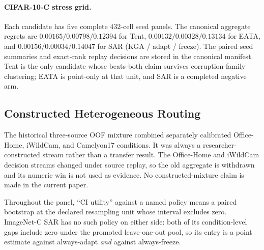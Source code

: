 \paragraph{CIFAR-10-C stress grid.} Each candidate has five complete $432$-cell seed panels. The
canonical aggregate regrets are $0.00165/0.00798/0.12394$ for Tent,
$0.00132/0.00328/0.13134$ for EATA, and $0.00156/0.00034/0.14047$ for SAR (KGA / adapt / freeze).
The paired seed summaries and exact-rank replay decisions are stored in the canonical manifest.
Tent is the only candidate whose beats-both claim survives corruption-family clustering; EATA is
point-only at that unit, and SAR is a completed negative arm.

\subsection{Constructed Heterogeneous Routing}\label{sec:constructed-routing}
The historical three-source OOF mixture combined separately calibrated Office-Home, iWildCam, and
Camelyon17 conditions. It was always a researcher-constructed stream rather than a transfer result.
The Office-Home and iWildCam decision streams changed under source replay, so the old aggregate is
withdrawn and its numeric win is not used as evidence. No constructed-mixture claim is
made in the current paper.

\noindent Throughout the panel, ``CI utility'' against a named policy means a paired bootstrap at
the declared resampling unit whose interval excludes zero. ImageNet-C SAR has no such policy on
either side: both of its condition-level gaps include zero under the promoted leave-one-out pool,
so its entry is a point estimate against always-adapt \emph{and} against always-freeze.

